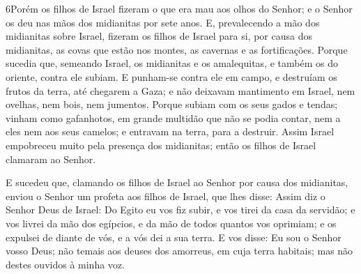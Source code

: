\medskip

\lettrine{6} Porém os filhos de Israel fizeram o que era mau
aos olhos do Senhor; e o Senhor os deu nas mãos dos midianitas por
sete anos. E, prevalecendo a mão dos midianitas sobre Israel,
fizeram os filhos de Israel para si, por causa dos midianitas, as
covas que estão nos montes, as cavernas e as fortificações.
Porque sucedia que, semeando Israel, os midianitas e os
amalequitas, e também os do oriente, contra ele subiam. E
punham-se contra ele em campo, e destruíam os frutos da terra, até
chegarem a Gaza; e não deixavam mantimento em Israel, nem ovelhas,
nem bois, nem jumentos. Porque subiam com os seus gados e
tendas; vinham como gafanhotos, em grande multidão que não se podia
contar, nem a eles nem aos seus camelos; e entravam na terra, para a
destruir. Assim Israel empobreceu muito pela presença dos
midianitas; então os filhos de Israel clamaram ao Senhor.

E sucedeu que, clamando os filhos de Israel ao Senhor por causa
dos midianitas, enviou o Senhor um profeta aos filhos de Israel,
que lhes disse: Assim diz o Senhor Deus de Israel: Do Egito eu vos
fiz subir, e vos tirei da casa da servidão; e vos livrei da mão
dos egípcios, e da mão de todos quantos vos oprimiam; e os expulsei
de diante de vós, e a vós dei a sua terra. E vos disse: Eu
sou o Senhor vosso Deus; não temais aos deuses dos amorreus, em cuja
terra habitais; mas não destes ouvidos à minha voz.

